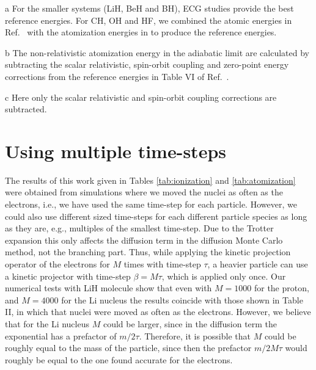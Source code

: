 \documentclass[pra,superscriptaddress,groupedaddress,twocolumn]{revtex4}
\begin{document}
\begin{table}[t!]
\begin{threeparttable}
\begin{tabular*}{\textwidth}{@{\extracolsep{\fill}} cccccccc}
\hline\hline
\end{tabular*}
\begin{tablenotes}
\item[a] For the smaller systems (LiH, BeH and BH), ECG studies provide the best reference energies. For CH, OH and HF, we combined the atomic energies in Ref.~\cite{Davidson_Atoms} with the atomization energies in \cite{Feller_Corrections} to produce the reference energies.
\item[b] The non-relativistic atomization energy in the adiabatic limit are calculated by subtracting the scalar relativistic, spin-orbit coupling and zero-point energy corrections from the reference energies in Table VI of Ref.~\cite{Feller_Corrections}.
\item[c] Here only the scalar relativistic and spin-orbit coupling corrections are subtracted.
\end{tablenotes}
\end{threeparttable}
\end{table} 


\section{Using multiple time-steps}
The results of this work given in Tables \ref{tab:ionization} and \ref{tab:atomization} were obtained from simulations where we moved the nuclei as often as the electrons, i.e., we have used the same time-step for each particle. However, we could also use different sized time-steps for each different particle species as long as they are, e.g., multiples of the smallest time-step. Due to the Trotter expansion \cite{Trotter} this only affects the diffusion term in the diffusion Monte Carlo method, not the branching part. Thus, while applying the kinetic projection operator of the electrons for $M$ times with time-step $\tau$, a heavier particle can use a kinetic projector with time-step $\beta=M\tau$, which is applied only once. Our numerical tests with LiH molecule show that even with $M=1000$ for the proton, and $M=4000$ for the Li nucleus the results coincide with those shown in Table II, in which that nuclei were moved as often as the electrons. However, we believe that for the Li nucleus $M$ could be larger, since in the diffusion term the exponential has a prefactor of $m/2\tau$. Therefore, it is possible that $M$ could be roughly equal to the mass of the particle, since then the prefactor $m/2M\tau$ would roughly be equal to the one found accurate for the electrons.
\end{document}
